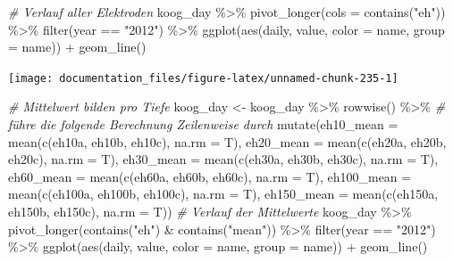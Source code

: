 \documentclass[
]{article}
\newenvironment{Shaded}{\begin{snugshade}}{\end{snugshade}}
\newcommand{\AttributeTok}[1]{\textcolor[rgb]{0.77,0.63,0.00}{#1}}
\newcommand{\CommentTok}[1]{\textcolor[rgb]{0.56,0.35,0.01}{\textit{#1}}}
\newcommand{\FunctionTok}[1]{\textcolor[rgb]{0.00,0.00,0.00}{#1}}
\newcommand{\NormalTok}[1]{#1}
\newcommand{\OtherTok}[1]{\textcolor[rgb]{0.56,0.35,0.01}{#1}}
\newcommand{\SpecialCharTok}[1]{\textcolor[rgb]{0.00,0.00,0.00}{#1}}
\newcommand{\StringTok}[1]{\textcolor[rgb]{0.31,0.60,0.02}{#1}}
\begin{document}
\begin{Shaded}
\begin{Highlighting}[]

\CommentTok{\# Verlauf aller Elektroden}
\NormalTok{koog\_day }\SpecialCharTok{\%\textgreater{}\%}
  \FunctionTok{pivot\_longer}\NormalTok{(}\AttributeTok{cols =} \FunctionTok{contains}\NormalTok{(}\StringTok{"eh"}\NormalTok{)) }\SpecialCharTok{\%\textgreater{}\%}
  \FunctionTok{filter}\NormalTok{(year }\SpecialCharTok{==} \StringTok{"2012"}\NormalTok{) }\SpecialCharTok{\%\textgreater{}\%}
  \FunctionTok{ggplot}\NormalTok{(}\FunctionTok{aes}\NormalTok{(daily, value, }\AttributeTok{color =}\NormalTok{ name, }\AttributeTok{group =}\NormalTok{ name)) }\SpecialCharTok{+}
  \FunctionTok{geom\_line}\NormalTok{()}
\end{Highlighting}
\end{Shaded}

\begin{center}\texttt{[image: documentation\_files/figure-latex/unnamed-chunk-235-1]} \end{center}

\begin{Shaded}
\begin{Highlighting}[]
\CommentTok{\# Mittelwert bilden pro Tiefe}
\NormalTok{koog\_day }\OtherTok{\textless{}{-}}\NormalTok{ koog\_day }\SpecialCharTok{\%\textgreater{}\%}
  \FunctionTok{rowwise}\NormalTok{() }\SpecialCharTok{\%\textgreater{}\%} \CommentTok{\# führe die folgende Berechnung Zeilenweise durch}
  \FunctionTok{mutate}\NormalTok{(}\AttributeTok{eh10\_mean =} \FunctionTok{mean}\NormalTok{(}\FunctionTok{c}\NormalTok{(eh10a, eh10b, eh10c), }\AttributeTok{na.rm =}\NormalTok{ T),}
         \AttributeTok{eh20\_mean =} \FunctionTok{mean}\NormalTok{(}\FunctionTok{c}\NormalTok{(eh20a, eh20b, eh20c), }\AttributeTok{na.rm =}\NormalTok{ T),}
         \AttributeTok{eh30\_mean =} \FunctionTok{mean}\NormalTok{(}\FunctionTok{c}\NormalTok{(eh30a, eh30b, eh30c), }\AttributeTok{na.rm =}\NormalTok{ T),}
         \AttributeTok{eh60\_mean =} \FunctionTok{mean}\NormalTok{(}\FunctionTok{c}\NormalTok{(eh60a, eh60b, eh60c), }\AttributeTok{na.rm =}\NormalTok{ T),}
         \AttributeTok{eh100\_mean =} \FunctionTok{mean}\NormalTok{(}\FunctionTok{c}\NormalTok{(eh100a, eh100b, eh100c), }\AttributeTok{na.rm =}\NormalTok{ T),}
         \AttributeTok{eh150\_mean =} \FunctionTok{mean}\NormalTok{(}\FunctionTok{c}\NormalTok{(eh150a, eh150b, eh150c), }\AttributeTok{na.rm =}\NormalTok{ T))}
\CommentTok{\# Verlauf der Mittelwerte }
\NormalTok{koog\_day }\SpecialCharTok{\%\textgreater{}\%}
  \FunctionTok{pivot\_longer}\NormalTok{(}\FunctionTok{contains}\NormalTok{(}\StringTok{"eh"}\NormalTok{) }\SpecialCharTok{\&} \FunctionTok{contains}\NormalTok{(}\StringTok{"mean"}\NormalTok{)) }\SpecialCharTok{\%\textgreater{}\%}
  \FunctionTok{filter}\NormalTok{(year }\SpecialCharTok{==} \StringTok{"2012"}\NormalTok{) }\SpecialCharTok{\%\textgreater{}\%}
  \FunctionTok{ggplot}\NormalTok{(}\FunctionTok{aes}\NormalTok{(daily, value, }\AttributeTok{color =}\NormalTok{ name, }\AttributeTok{group =}\NormalTok{ name)) }\SpecialCharTok{+}
  \FunctionTok{geom\_line}\NormalTok{()}
\end{Highlighting}
\end{Shaded}
\end{document}
